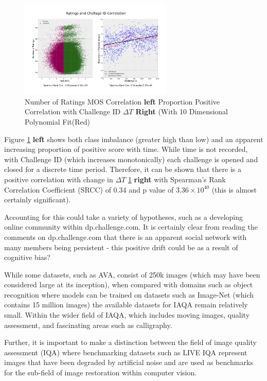 \begin{figure}[ht!]
\centering
\includegraphics[width=0.65\textwidth]{figures/data_plots/MOS_rating_corr_gt.png}
 \caption{ Number of Ratings MOS Correlation \textbf{left} Proportion Positive Correlation with Challenge ID $\Delta T$ \textbf{Right} (With 10 Dimensional Polynomial Fit(Red)}
 \label{fig:AVA_corr}
 \specialrule{0.01em}{0.2em}{0.2em}
\end{figure}

Figure \ref{fig:AVA_corr} \textbf{left} shows both class imbalance (greater high than low) and an apparent increasing proportion of positive score with time. While time is not recorded, with Challenge ID (which increases monotonically) each challenge is opened and closed for a discrete time period. Therefore, it can be shown that there is a positive correlation with change in $\Delta T$ \ref{fig:AVA_corr} \textbf{right} with Spearman's Rank Correlation Coefficient (SRCC) of 0.34 and p value of $3.36 \times 10^{40}$ (this is almost certainly significant).\par 

Accounting for this could take a variety of hypotheses, such as a developing online community within dp.challenge.com. It is certainly clear from reading the comments on dp.challenge.com that there is an apparent social network with many members being persistent - this positive drift could be as a result of cognitive bias? \par 

While some datasets, such as AVA, consist of 250k images (which may have been considered large at its inception), when compared with domains such as object recognition where models can be trained on datasets such as Image-Net (which contains 15 million  images\cite{He2015a}) the available datasets for IAQA remain relatively small. Within the wider field of IAQA, which includes moving images, quality assessment, and fascinating areas such as calligraphy. 

Further, it is important to make a distinction between the field of image quality assessment (IQA) where benchmarking datasets such as LIVE IQA\cite{Ghadiyaram2016} represent images that have been degraded by artificial noise and are used as benchmarks for the sub-field of image restoration within computer vision. 


